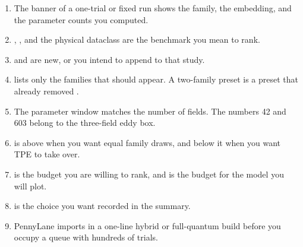 \begin{enumerate}
\item The banner of a one-trial or fixed run shows the family, the embedding, and the parameter counts you computed.
\item {}, , and the physical dataclass are the benchmark you mean to rank.
\item {} and  are new, or you intend to append to that study.
\item {} lists only the families that should appear.
  A two-family preset is a preset that already removed .
\item The parameter window matches the number of fields.
  The numbers 42 and 603 belong to the three-field eddy box.
\item {} is above  when you want equal family draws, and below it when you want TPE to take over.
\item {} is the budget you are willing to rank, and  is the budget for the model you will plot.
\item {} is the choice you want recorded in the summary.
\item PennyLane imports in a one-line hybrid or full-quantum build before you occupy a queue with hundreds of trials.
\end{enumerate}
